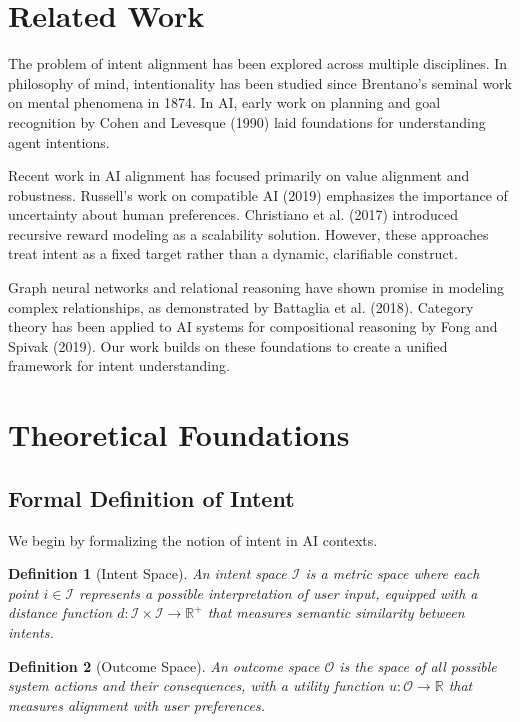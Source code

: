 \documentclass[12pt]{article}
\newtheorem{definition}{Definition}
\begin{document}
\section{Related Work}

The problem of intent alignment has been explored across multiple disciplines. In philosophy of mind, intentionality has been studied since Brentano's seminal work on mental phenomena in 1874. In AI, early work on planning and goal recognition by Cohen and Levesque (1990) laid foundations for understanding agent intentions.

Recent work in AI alignment has focused primarily on value alignment and robustness. Russell's work on compatible AI (2019) emphasizes the importance of uncertainty about human preferences. Christiano et al. (2017) introduced recursive reward modeling as a scalability solution. However, these approaches treat intent as a fixed target rather than a dynamic, clarifiable construct.

Graph neural networks and relational reasoning have shown promise in modeling complex relationships, as demonstrated by Battaglia et al. (2018). Category theory has been applied to AI systems for compositional reasoning by Fong and Spivak (2019). Our work builds on these foundations to create a unified framework for intent understanding.

\section{Theoretical Foundations}

\subsection{Formal Definition of Intent}

We begin by formalizing the notion of intent in AI contexts.

\begin{definition}[Intent Space]
An intent space $\mathcal{I}$ is a metric space where each point $i \in \mathcal{I}$ represents a possible interpretation of user input, equipped with a distance function $d: \mathcal{I} \times \mathcal{I} \rightarrow \mathbb{R}^+$ that measures semantic similarity between intents.
\end{definition}

\begin{definition}[Outcome Space]
An outcome space $\mathcal{O}$ is the space of all possible system actions and their consequences, with a utility function $u: \mathcal{O} \rightarrow \mathbb{R}$ that measures alignment with user preferences.
\end{definition}
\end{document}
